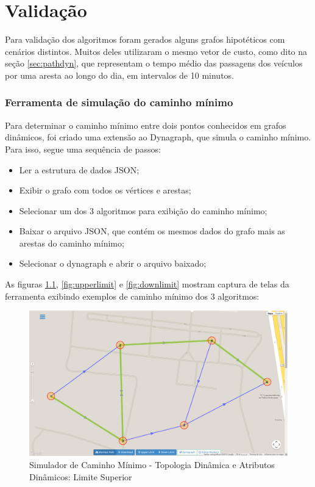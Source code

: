 \chapter{Validação}

Para validação dos algoritmos foram gerados alguns grafos hipotéticos com cenários distintos.
Muitos deles utilizaram o mesmo vetor de custo, como dito na seção \ref{sec:pathdyn}, que representam
o tempo médio das passagens dos veículos por uma aresta ao longo do dia, em intervalos de 10 minutos.


\subsection{Ferramenta de simulação do caminho mínimo}
Para determinar o caminho mínimo entre dois pontos conhecidos em grafos dinâmicos, foi criado
uma extensão ao Dynagraph, que simula o caminho mínimo. Para isso, segue uma sequência de passos:
\begin{itemize}
\item Ler a estrutura de dados JSON;
\item Exibir o grafo com todos os vértices e arestas;
\item Selecionar um dos 3 algoritmos para exibição do caminho mínimo;
\item Baixar o arquivo JSON, que contém os mesmos dados do grafo mais as arestas do caminho mínimo;
\item Selecionar o dynagraph e abrir o arquivo baixado;
\end{itemize}

As figuras \ref{fig:shortestpath}, \ref{fig:upperlimit} e \ref{fig:downlimit} mostram captura de telas
da ferramenta exibindo exemplos de caminho mínimo dos 3 algoritmos:

\begin{figure}[htbp]
\centering
 \includegraphics[width=.90\textwidth]{chapters/fig/shortestpath.png}
\caption{Simulador de Caminho Mínimo - Topologia Dinâmica e Atributos Dinâmicos: Limite Superior}
\label{fig:shortestpath}
\end{figure}
\FloatBarrier

